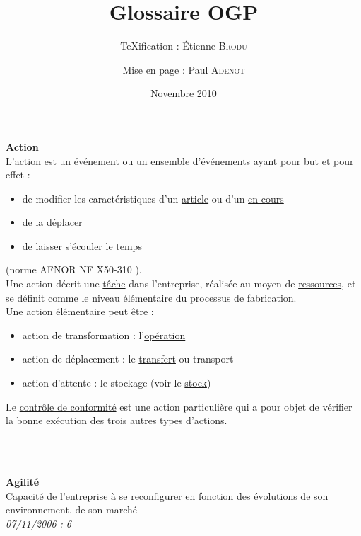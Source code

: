 \documentclass[12pt,a4paper]{article}
\title{Glossaire OGP}
\author{\TeX{}ification : Étienne \textsc{Brodu} \and Mise en page : Paul \textsc{Adenot}}
\date{Novembre 2010}
\newcommand{\fontlignedroite}[1]{%
    \textsf{\Large{\textbf{#1}}}
}
\newlength{\largeurtitre}
\newlength{\largeurligne}
\newcommand{\lignedroite}[1]{%
    \setlength{\largeurtitre}{0pt}
    \setlength{\largeurligne}{0pt}
    \settowidth{\largeurtitre}{\fontlignedroite{#1}}
    \addtolength{\largeurligne}{\textwidth}
    \addtolength{\largeurligne}{-\largeurtitre}
    \addtolength{\largeurligne}{-4pt}
    \bigskip
    \fontlignedroite{#1} \raisebox{0.3em}{\vrule depth 0pt height 0.6pt width
	\largeurligne}%
}
\newcommand{\lignegauche}[1]{%
    \setlength{\largeurtitre}{0pt}
    \setlength{\largeurligne}{0pt}
    \settowidth{\largeurtitre}{\fontlignedroite{#1}}
    \addtolength{\largeurligne}{\textwidth}
    \addtolength{\largeurligne}{-\largeurtitre}
    \addtolength{\largeurligne}{-4pt}
    \bigskip
    \raisebox{0.3em}{\vrule depth 0pt height 0.6pt width \largeurligne} #1%
}
\newcommand{\definition}[3]{
	\begin{minipage}{\textwidth}
		\lignedroite{#1}\\
		#2\\
	\ifthenelse{\isempty{#3}}%
	    {\raisebox{0.3em}{\vrule depth 0pt height 0.6pt width \textwidth}}%
	    {\lignegauche{\footnotesize \textit{#3}}}%
    \end{minipage}
    \\\\
}
\begin{document}
\maketitle
\newpage

\definition{Action}
{
	L'\href{http://gpr.insa-lyon.fr/supgedem/Home/Le_monde_industriel/L_entreprise/Le_systeme_physique_de_production/actions.htm}{action} est un événement ou un ensemble d'événements ayant pour but et pour effet :
	\begin{itemize}
	\item de modifier les caractéristiques d'un \href{http://gpr.insa-lyon.fr/supgedem/Home/glossaire/garticle.htm}{article} ou d'un \href{http://gpr.insa-lyon.fr/supgedem/Home/Le_monde_industriel/L_entreprise/Le_systeme_physique_de_production/lencours.htm}{en-cours}
	\item de la déplacer
	\item de laisser s'écouler le temps
	\end{itemize}
	(norme AFNOR NF X50-310 ).\\
	Une action décrit une \href{http://gpr.insa-lyon.fr/supgedem/Home/glossaire/glestach.htm}{tâche} dans l'entreprise, réalisée au moyen de \href{http://gpr.insa-lyon.fr/supgedem/Home/Le_monde_industriel/L_entreprise/Le_systeme_physique_de_production/ressources.htm}{ressources}, et se définit comme le niveau élémentaire du processus de fabrication.\\
	Une action élémentaire peut être :
	\begin{itemize}
	\item action de transformation : l'\href{http://gpr.insa-lyon.fr/supgedem/Home/Le_monde_industriel/L_entreprise/Le_systeme_physique_de_production/actions.htm}{opération}
	\item action de déplacement : le \href{http://gpr.insa-lyon.fr/supgedem/Home/Le_monde_industriel/L_entreprise/Le_systeme_physique_de_production/letransfert.htm}{transfert} ou transport
	\item action d'attente : le stockage (voir le \href{http://gpr.insa-lyon.fr/supgedem/Home/Le_monde_industriel/L_entreprise/Le_systeme_physique_de_production/Le_stock/lestock.htm}{stock})
	\end{itemize}
	Le \href{http://gpr.insa-lyon.fr/supgedem/Home/glossaire/glecontroledeconformite.htm}{contrôle de conformité} est une action particulière qui a pour objet de vérifier la bonne exécution des trois autres types d'actions.
}{}

\definition{Agilité}
{
	Capacité de l'entreprise à se reconfigurer en fonction des évolutions de son environnement, de son marché
	}{07/11/2006 : 6}
\end{document}
